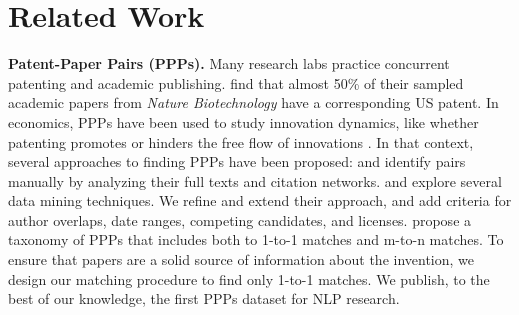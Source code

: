 \section{Related Work}

\noindent\textbf{Patent-Paper Pairs (PPPs). }
Many research labs practice concurrent patenting and academic publishing.
\citet{murrayFormalIntellectualProperty2005} find that almost 50\% of their sampled academic papers from \textit{Nature Biotechnology} have a corresponding US patent.
In economics, PPPs have been used to study innovation dynamics, like whether patenting promotes or hinders the free flow of innovations \cite{murrayFormalIntellectualProperty2005,magermanSearchAnticommonsPatentpaper2011}.
In that context, several approaches to finding PPPs have been proposed:
\citet{murrayInnovationCoevolutionScientific2002} and \citet{murrayFormalIntellectualProperty2005} identify pairs manually by analyzing their full texts and citation networks.
\citet{magermanExploringFeasibilityAccuracy2010} and \citet{vanlooyAssessmentLatentSemantic2011} explore several data mining techniques.
We refine and extend their approach, and add criteria for author overlaps, date ranges, competing candidates, and licenses.
\citet{gansPatentsPapersPairs2008} propose a taxonomy of PPPs that includes both to 1-to-1 matches and m-to-n matches.
To ensure that papers are a solid source of information about the invention, we design our matching procedure to find only 1-to-1 matches.
We publish, to the best of our knowledge, the first PPPs dataset for NLP research.


